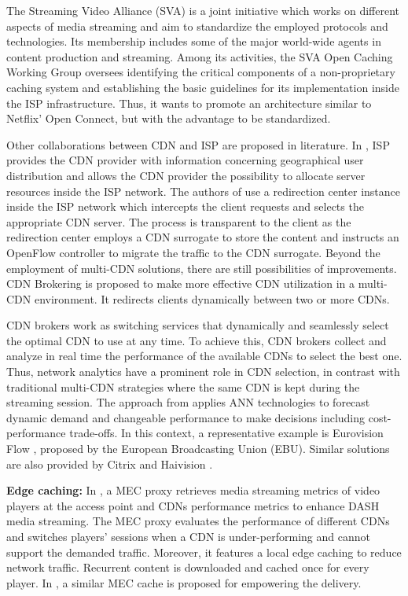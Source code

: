 The Streaming Video Alliance (SVA) is a joint initiative which works on different aspects of media streaming and aim to standardize the employed protocols and technologies. Its membership includes some of the major world-wide agents in content production and streaming. Among its activities, the SVA Open Caching Working Group \cite{OpenCaching} oversees identifying the critical components of a non-proprietary caching system and establishing the basic guidelines for its implementation inside the ISP infrastructure. Thus, it wants to promote an architecture similar to Netflix' Open Connect, but with the advantage to be standardized.

Other collaborations between CDN and ISP are proposed in literature. In \cite{frank2013}, ISP provides the CDN provider with information concerning geographical user distribution and allows the CDN provider the possibility to allocate server resources inside the ISP network. The authors of \cite{wichtlhuber2015} use a redirection center instance inside the ISP network which intercepts the client requests and selects the appropriate CDN server. The process is transparent to the client as the redirection center employs a CDN surrogate to store the content and instructs an OpenFlow controller to migrate the traffic to the CDN surrogate.
Beyond the employment of multi-CDN solutions, there are still possibilities of improvements. CDN Brokering \cite{biliris2002} is proposed to make more effective CDN utilization in a multi-CDN environment. It redirects clients dynamically between two or more CDNs.

CDN brokers work as switching services that dynamically and seamlessly select the optimal CDN to use at any time. To achieve this, CDN brokers collect and analyze in real time the performance of the available CDNs to select the best one. Thus, network analytics have a prominent role in CDN selection, in contrast with traditional multi-CDN strategies where the same CDN is kept during the streaming session.
The approach from \cite{Viola2020} applies ANN technologies to forecast dynamic demand and changeable performance to make decisions including cost-performance trade-offs.
In this context, a representative example is Eurovision Flow \cite{EurovisionFLOW}, proposed by the European Broadcasting Union (EBU). Similar solutions are also provided by Citrix \cite{citrix2} and Haivision \cite{lightflow}.

\textbf{Edge caching:}
In \cite{viola2018}, a MEC proxy retrieves media streaming metrics of video players at the access point and CDNs performance metrics to enhance DASH media streaming. The MEC proxy evaluates the performance of different CDNs and switches players' sessions when a CDN is under-performing and cannot support the demanded traffic. Moreover, it features a local edge caching to reduce network traffic. Recurrent content is downloaded and cached once for every player. In \cite{carrozzo2018}, a similar MEC cache is proposed for empowering the delivery.

